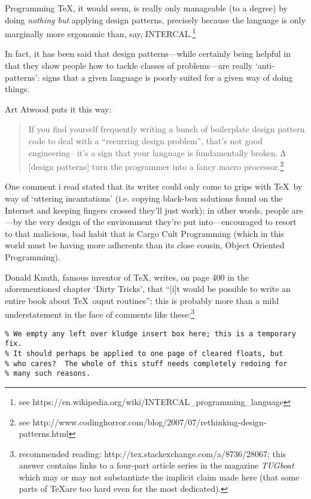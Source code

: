 Programming \TeX, it would seem, is
really only manageable (to a degree) by doing {\em nothing but} applying design patterns, precisely because
the language is only marginally more ergonomic than, say, INTERCAL.\footnote{see
https://en.wikipedia.org/wiki/INTERCAL\_programming\_language}

In fact, it has been said that design patterns---while certainly being
helpful in that they show people how to tackle classes of problems---are really `anti-patterns': signs that
a given language is poorly suited for a given way of doing things.

Art Atwood puts it this way:

\begin{quote}
If you find yourself frequently writing a bunch of boilerplate design pattern code to deal with
a ``recurring design problem'', that's not good engineering-- it's a sign that your language is fundamentally
broken. ∆ [design patterns] turn the programmer into a fancy macro processor.\footnote{see
http://www.codinghorror.com/blog/2007/07/rethinking-design-patterns.html}
\end{quote}

One comment i read stated that its writer could only come to grips with \TeX\ by way of `uttering
incantations' (i.e. copying black-box solutions found on the Internet and keeping fingers crossed they'll
just work); in other words, people are---by the very design of the environment they're put into---encouraged
to resort to that malicious, bad habit that is Cargo Cult Programming (which
in this world must be having more adherents than its close cousin, Object Oriented Programming).

Donald Knuth, famous inventor of \TeX, writes, on page 400 in the aforementioned chapter `Dirty Tricks',
that ``[i]t would be possible to write an entire book about \TeX\ ouput routines''; this is probably more
than a mild understatement in the face of comments like these:\footnote{recommended reading:
http://tex.stackexchange.com/a/8736/28067; this answer contains links to a four-part article series in the
magazine {\em TUGboat} which may or may not substantiate the implicit claim made here (that some parts of
\TeX are  too hard even for the most dedicated).}

\begin{verbatim}
% We empty any left over kludge insert box here; this is a temporary fix.
% It should perhaps be applied to one page of cleared floats, but
% who cares?  The whole of this stuff needs completely redoing for
% many such reasons.
\end{verbatim}

